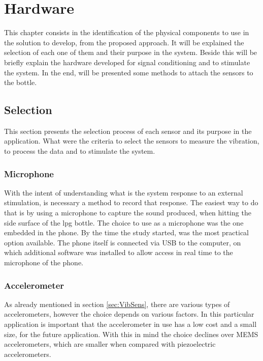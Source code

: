 \cleardoublepage
\chapter{Hardware}\label{chap:hardware}
This chapter consists in the identification of the physical components to use in the solution to develop, from the proposed approach. It will be explained the selection of each one of them and their purpose in the system. Beside this will be briefly explain the hardware developed for signal conditioning and to stimulate the system. In the end, will be presented some methods to attach the sensors to the bottle.
\section{Selection}
This section presents the selection process of each sensor and its purpose in the application. What were the criteria to select the sensors to measure the vibration,  to process the data and to stimulate the system. 
\subsection{Microphone}
With the intent of understanding what is the system response to an external stimulation, is necessary a method to record that response. The easiest way to do that is by using a microphone to capture the sound produced, when hitting the side surface of the \acrshort{lpg} bottle.
The choice to use as a microphone was the one embedded in the phone. By the time the study started, was the most practical option available. The phone itself is connected via USB to the computer, on which additional software was installed to allow access in real time to the microphone of the phone.  
\subsection{Accelerometer}
As already mentioned in section \ref{sec:VibSens}, there are various types of accelerometers, however the choice depends on various factors. In this particular application is important that the accelerometer in use has a low cost and a small size, for the future application. With this in mind the choice declines over MEMS accelerometers, which are smaller when compared with piezoelectric accelerometers.


